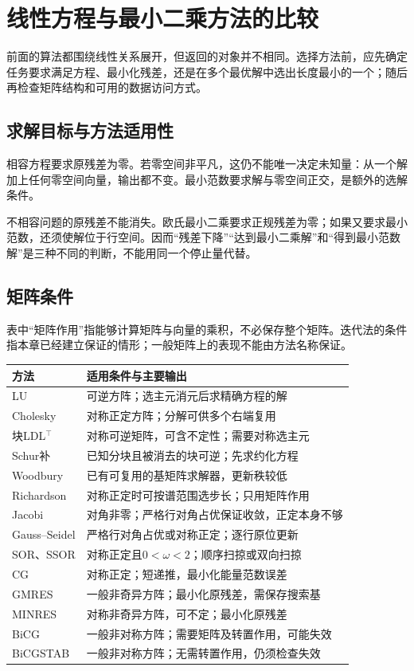 \section{线性方程与最小二乘方法的比较}

前面的算法都围绕线性关系展开，但返回的对象并不相同。选择方法前，应先确定任务要求满足方程、最小化残差，还是在多个最优解中选出长度最小的一个；随后再检查矩阵结构和可用的数据访问方式。

\subsection{求解目标与方法适用性}

相容方程要求原残差为零。若零空间非平凡，这仍不能唯一决定未知量：从一个解加上任何零空间向量，输出都不变。最小范数要求解与零空间正交，是额外的选解条件。

不相容问题的原残差不能消失。欧氏最小二乘要求正规残差为零；如果又要求最小范数，还须使解位于行空间。因而“残差下降”“达到最小二乘解”和“得到最小范数解”是三种不同的判断，不能用同一个停止量代替。

\subsection{矩阵条件}

表中“矩阵作用”指能够计算矩阵与向量的乘积，不必保存整个矩阵。迭代法的条件指本章已经建立保证的情形；一般矩阵上的表现不能由方法名称保证。

\begin{center}
\small
\begin{tabular}{p{}p{}}
\toprule
方法 & 适用条件与主要输出\\
\midrule
LU & 可逆方阵；选主元消元后求精确方程的解\\
Cholesky & 对称正定方阵；分解可供多个右端复用\\
块LDL$^\top$ & 对称可逆矩阵，可含不定性；需要对称选主元\\
Schur补 & 已知分块且被消去的块可逆；先求约化方程\\
Woodbury & 已有可复用的基矩阵求解器，更新秩较低\\
Richardson & 对称正定时可按谱范围选步长；只用矩阵作用\\
Jacobi & 对角非零；严格行对角占优保证收敛，正定本身不够\\
Gauss--Seidel & 严格行对角占优或对称正定；逐行原位更新\\
SOR、SSOR & 对称正定且$0<\omega<2$；顺序扫掠或双向扫掠\\
CG & 对称正定；短递推，最小化能量范数误差\\
GMRES & 一般非奇异方阵；最小化原残差，需保存搜索基\\
MINRES & 对称非奇异方阵，可不定；最小化原残差\\
BiCG & 一般非对称方阵；需要矩阵及转置作用，可能失效\\
BiCGSTAB & 一般非对称方阵；无需转置作用，仍须检查失效\\
\bottomrule
\end{tabular}
\end{center}

